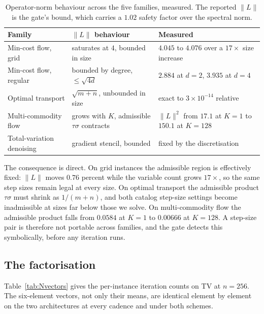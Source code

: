 \begin{table}[t]
\caption{Operator-norm behaviour across the five families, measured. The
reported $\|L\|$ is the gate's bound, which carries a $1.02$ safety factor over
the spectral norm.}
\label{tab:opnorm}
\begin{center}
\begin{tabular}{lll}
\toprule
Family & $\|L\|$ behaviour & Measured \\
\midrule
Min-cost flow, grid & saturates at $4$, bounded in size & $4.045$ to $4.076$ over a $17\times$ size increase \\
Min-cost flow, regular & bounded by degree, $\leq \sqrt{4d}$ & $2.884$ at $d=2$, $3.935$ at $d=4$ \\
Optimal transport & $\sqrt{m+n}$, unbounded in size & exact to $3 \times 10^{-14}$ relative \\
Multi-commodity flow & grows with $K$, admissible $\tau\sigma$ contracts & $\|L\|^2$ from $17.1$ at $K{=}1$ to $150.1$ at $K{=}128$ \\
Total-variation denoising & gradient stencil, bounded & fixed by the discretisation \\
\bottomrule
\end{tabular}
\end{center}
\end{table}

The consequence is direct. On grid instances the admissible region is
effectively fixed: $\|L\|$ moves $0.76$ percent while the variable count grows
$17\times$, so the same step sizes remain legal at every size. On optimal
transport the admissible product $\tau\sigma$ must shrink as $1/(m+n)$, and both
catalog step-size settings become inadmissible at sizes far below those we
solve. On multi-commodity flow the admissible product falls from $0.0584$ at
$K=1$ to $0.00666$ at $K=128$. A step-size pair is therefore not portable across
families, and the gate detects this symbolically, before any iteration runs.

\subsection{The factorisation}
\label{sec:exp:factorisation}

Table~\ref{tab:Nvectors} gives the per-instance iteration counts on TV at
$n=256$. The six-element vectors, not only their means, are identical element by
element on the two architectures at every cadence and under both schemes.


